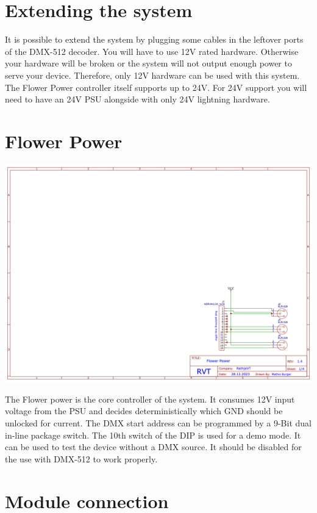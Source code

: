 \documentclass[10pt]{datasheet}
\begin{document}
\section{Extending the system}

It is possible to extend the system by plugging some cables in the leftover ports of the DMX-512 decoder. You will have to use 12V rated hardware. Otherwise your hardware
will be broken or the system will not output enough power to serve your device. Therefore, only 12V hardware can be used with this system. 
The Flower Power controller itself supports up to 24V. For 24V support you will need to have an 24V PSU alongside with only 24V lightning hardware.

\pagebreak

\section{Flower Power}

\includegraphics[scale=0.4]{Flower Power.png}

The Flower power is the core controller of the system. It consumes 12V input voltage from the PSU and decides deterministically which GND should be unlocked for current.
The DMX start address can be programmed by a 9-Bit dual in-line package switch. The 10th switch of the DIP is used for a demo mode. It can be used to test the device without a DMX source.
It should be disabled for the use with DMX-512 to work properly. 

\section{Module connection}
\end{document}
